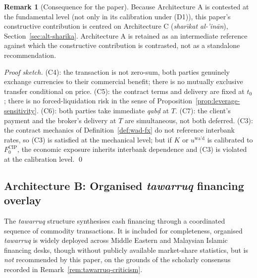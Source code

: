 \documentclass[preprint,12pt,authoryear]{elsarticle}
\theoremstyle{definition}
\newtheorem{remark}{Remark}[section]
\begin{document}
\begin{remark}[Consequence for the paper]
\label{rem:wad-outcome}
Because Architecture A is contested at the fundamental level
(not only in its calibration under (D1)), this paper's
constructive contribution is centred on Architecture C
(\emph{shar\={\i}kat al-'in\={a}n}), Section~\ref{sec:alt-sharika}.
Architecture A is retained as an intermediate reference against
which the constructive contribution is contrasted, not as a
standalone recommendation.
\end{remark}

\begin{proof}[Proof sketch]
(C4): the transaction is not zero-sum, both parties genuinely
exchange currencies to their commercial benefit; there is no
mutually exclusive transfer conditional on price. (C5): the
contract terms and delivery are fixed at $t_0$; there is no
forced-liquidation risk in the sense of
Proposition~\ref{prop:leverage-sensitivity}. (C6): both parties
take immediate \emph{qab\d{d}} at $T$. (C7): the client's payment
and the broker's delivery at $T$ are simultaneous, not both
deferred. (C3): the contract mechanics of
Definition~\ref{def:wad-fx} do not reference interbank rates, so
(C3) is satisfied at the mechanical level; but if $K$ or
$u^{\text{wa'd}}$ is calibrated to $F^{\text{CIP}}_0$, the
economic exposure inherits interbank dependence and (C3) is
violated at the calibration level. \qed
\end{proof}

\subsection{Architecture B: Organised \emph{tawarruq} financing
    overlay}
\label{sec:alt-tawarruq}

The \emph{tawarruq} structure synthesises cash financing through a
coordinated sequence of commodity transactions. It is included for
completeness, organised \emph{tawarruq} is widely deployed
across Middle Eastern and Malaysian Islamic financing desks, though
without publicly available market-share statistics, but is
\emph{not} recommended by this paper, on the grounds of the
scholarly consensus recorded in
Remark~\ref{rem:tawarruq-criticism}.
\end{document}

